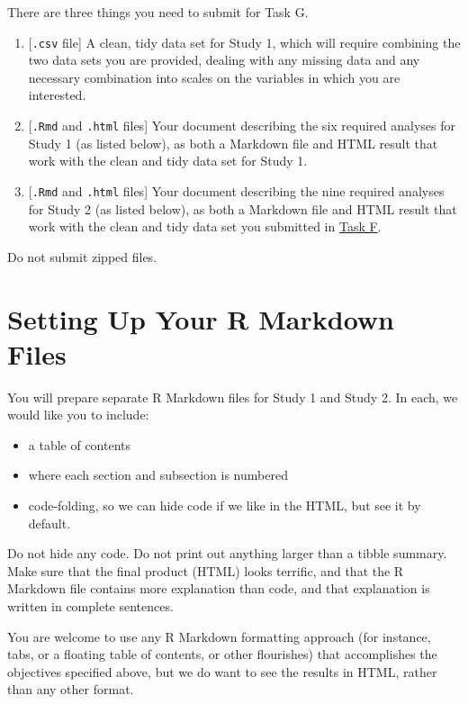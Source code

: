 \documentclass[]{book}
\providecommand{\tightlist}{%
  \setlength{\itemsep}{0pt}\setlength{\parskip}{0pt}}
\theoremstyle{definition}
\theoremstyle{definition}
\theoremstyle{definition}
\theoremstyle{remark}
\begin{document}
There are three things you need to submit for Task G.

\begin{enumerate}
\def\labelenumi{\arabic{enumi}.}
\tightlist
\item
  {[}\texttt{.csv} file{]} A clean, tidy data set for Study 1, which
  will require combining the two data sets you are provided, dealing
  with any missing data and any necessary combination into scales on the
  variables in which you are interested.
\item
  {[}\texttt{.Rmd} and \texttt{.html} files{]} Your document describing
  the six required analyses for Study 1 (as listed below), as both a
  Markdown file and HTML result that work with the clean and tidy data
  set for Study 1.
\item
  {[}\texttt{.Rmd} and \texttt{.html} files{]} Your document describing
  the nine required analyses for Study 2 (as listed below), as both a
  Markdown file and HTML result that work with the clean and tidy data
  set you submitted in \protect\hyperlink{taskF}{Task F}.
\end{enumerate}

Do not submit zipped files.

\hypertarget{setting-up-your-r-markdown-files}{%
\section{Setting Up Your R Markdown
Files}\label{setting-up-your-r-markdown-files}}

You will prepare separate R Markdown files for Study 1 and Study 2. In
each, we would like you to include:

\begin{itemize}
\tightlist
\item
  a table of contents
\item
  where each section and subsection is numbered
\item
  code-folding, so we can hide code if we like in the HTML, but see it
  by default.
\end{itemize}

Do not hide any code. Do not print out anything larger than a tibble
summary. Make sure that the final product (HTML) looks terrific, and
that the R Markdown file contains more explanation than code, and that
explanation is written in complete sentences.

You are welcome to use any R Markdown formatting approach (for instance,
tabs, or a floating table of contents, or other flourishes) that
accomplishes the objectives specified above, but we do want to see the
results in HTML, rather than any other format.
\end{document}
